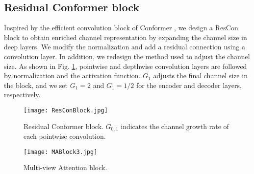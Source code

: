 \documentclass{article}
\begin{document}
\subsection{Residual Conformer block}
\label{sec:rescon}
Inspired by the efficient convolution block of Conformer \cite{gulati2020conformer}, we design a ResCon block to obtain enriched channel representation by expanding the channel size in deep layers. We modify the normalization and add a residual connection using a convolution layer. In addition, we redesign the method used to adjust the channel size. As shown in Fig. \ref{fig:rescon}, pointwise and depthwise convolution layers are followed by normalization and the activation function. $G_{1}$ adjusts the final channel size in the block, and we set $G_{1}=2$ and $G_{1}=1/2$ for the encoder and decoder layers, respectively. 
\begin{figure}[h]
\centerline{\texttt{[image: ResConBlock.jpg]}}
\caption{Residual Conformer block. $G_{0,1}$ indicates the channel growth rate of each pointwise convolution.}
\label{fig:rescon}
\end{figure}
\begin{figure}[h]
\centerline{\texttt{[image: MABlock3.jpg]}}
\caption{Multi-view Attention block.}
\label{fig:mablock}
\end{figure}
\end{document}
